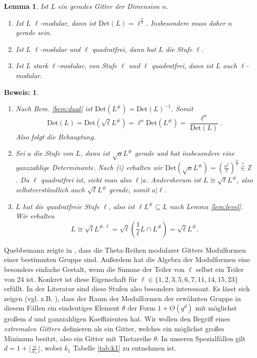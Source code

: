 \documentclass[12pt,a4paper,halfparskip,headsepline,bibtotocnumbered]{scrreprt}
\theoremstyle{nummermitklammern}
\newtheorem{lemma}[defsatzusw]{Lemma}
\theoremstyle{nonumberbreak}
\newtheorem{beweis}{Beweis:}
\newcommand{\Z}{\mathbb{Z}}
\newcommand{\Det}{\text{Det}}
\begin{document}
\begin{framed}
	\begin{lemma}\label{lem:mod}
		Ist $L$ ein gerades Gitter der Dimension $n$.
		\begin{enumerate}[label=(\roman*)]
			\item Ist $L$ $\ell$-modular, dann ist $\Det(L) = \ell^{\frac{n}{2}}$. Insbesondere muss daher $n$ gerade sein.
			\item Ist $L$ $\ell$-modular und $\ell$ quadratfrei, dann hat $L$ die Stufe $\ell$.
			\item Ist $L$ stark $\ell$-modular, von Stufe $\ell$ und $\ell$ quadratfrei, dann ist $L$ auch $\ell$-modular.
		\end{enumerate}
	\end{lemma}
\end{framed}
\begin{beweis}
	\begin{enumerate}[label=(\roman*)]
		\item Nach Bem. \eqref{bem:dual} ist $\Det(L^\#) = \Det(L)^{-1}$. Somit
			\begin{equation*}
				\Det(L) = \Det(\sqrt{\ell} L^\#) = \ell^n \Det(L^\#) = \frac{\ell^n}{\Det(L)}.
			\end{equation*}
			Also folgt die Behauptung.
		\item Sei $a$ die Stufe von $L$, dann ist $\sqrt{a}L^\#$ gerade und hat insbesondere eine ganzzahlige Determinante. Nach (i) erhalten wir $\Det(\sqrt{a}L^\#) = \left( \frac{a^2}{\ell} \right) ^\frac{n}{2} \stackrel{!}{\in} \Z$. Da $\ell$ quadratfrei ist, sieht man also $\ell \vert a$. Andersherum ist $L \cong \sqrt{\ell}L^\#$, also selbstverständlich auch $\sqrt{\ell} L^\#$ gerade, somit $a \vert \ell$.
		\item $L$ hat die quadratfreie Stufe $\ell$, also ist $\ell L^\# \subseteq L$ nach Lemma \eqref{lem:level}. Wir erhalten
			\begin{equation*}
				L \cong \sqrt{l} L^{\#,\ell} = \sqrt{\ell} \left( \frac{1}{\ell} L \cap L^\# \right) = \sqrt{\ell} L^\#.
			\end{equation*}
	\end{enumerate}
\end{beweis}

Quebbemann zeigte in \cite{quebbemann}, dass die Theta-Reihen modularer Gitters Modulformen einer bestimmten Gruppe sind. Außerdem hat die Algebra der Modulformen eine besonders einfache Gestalt, wenn die Summe der Teiler von $\ell$ selbst ein Teiler von $24$ ist. Konkret ist diese Eigenschaft für $\ell \in \lbrace 1,2,3,5,6,7,11,14,15,23 \rbrace$ erfüllt. In der Literatur sind diese Stufen also besonders interessant. Es lässt sich zeigen (vgl. z.B. \cite[1.2.2]{juergens}), dass der Raum der Modulformen der erwähnten Gruppe in diesem Fällen ein eindeutiges Element $\theta$ der Form $1 + O(q^d)$ mit möglichst großem $d$ und ganzzahligen Koeffizienten hat. Wir wollen den Begriff eines \textit{extremalen Gitters} definieren als ein Gitter, welches ein möglichst großes Minimum besitzt, also ein Gitter mit Thetareihe $\theta$. In unseren Spezialfällen gilt $d = 1 + \lfloor \frac{n}{k_1} \rfloor$, wobei $k_1$ Tabelle \eqref{tab:k1} zu entnehmen ist.
\end{document}
